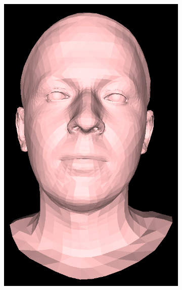 \begin{figure}[h]
    \centering
    \begin{subfigure}[b]{0.19\textwidth}
        \includegraphics[width=\textwidth]{figures/voca_exp/vocaset_exp1.png}
    \end{subfigure}
    \begin{subfigure}[b]{0.19\textwidth}

\end{subfigure}
\end{figure}
